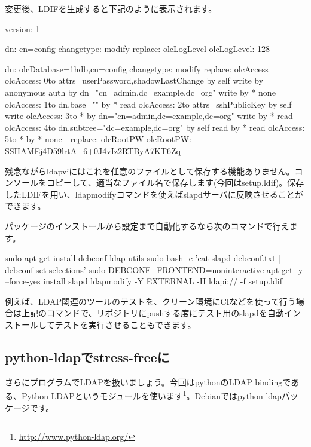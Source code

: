 \documentclass[mingoth,a4paper]{jsarticle}
\begin{document}
変更後、LDIFを生成すると下記のように表示されます。

\begin{commandline}
version: 1

dn: cn=config
changetype: modify
replace: olcLogLevel
olcLogLevel: 128
-

dn: olcDatabase={1}hdb,cn=config
changetype: modify
replace: olcAccess
olcAccess: {0}to attrs=userPassword,shadowLastChange by self write by anonymous auth
 by dn="cn=admin,dc=example,dc=org" write by * none
olcAccess: {1}to dn.base="" by * read
olcAccess: {2}to attrs=sshPublicKey by self write
olcAccess: {3}to * by dn="cn=admin,dc=example,dc=org" write by * read
olcAccess: {4}to dn.subtree="dc=example,dc=org" by self read by * read
olcAccess: {5}to * by * none
-
replace: olcRootPW
olcRootPW: {SSHA}MEj4D59lrtA+6+0J4vIz2RTByA7KT6Zq
\end{commandline}

残念ながらldapviにはこれを任意のファイルとして保存する機能ありません。コンソールをコピーして、適当なファイル名で保存します(今回はsetup.ldif)。保存したLDIFを用い、ldapmodifyコマンドを使えばslapdサーバに反映させることができます。


パッケージのインストールから設定まで自動化するなら次のコマンドで行えます。

\begin{commandline}
sudo apt-get install debconf ldap-utils
sudo bash -c 'cat slapd-debconf.txt | debconf-set-selections'
sudo DEBCONF_FRONTEND=noninteractive apt-get -y --force-yes install slapd
ldapmodify -Y EXTERNAL -H ldapi:// -f setup.ldif
\end{commandline}

例えば、LDAP関連のツールのテストを、クリーン環境にCIなどを使って行う場合は上記のコマンドで、リポジトリにpushする度にテスト用のslapdを自動インストールしてテストを実行させることもできます。

\subsection{python-ldapでstress-freeに}

さらにプログラムでLDAPを扱いましょう。今回はpythonのLDAP bindingである、Python-LDAPというモジュールを使います\footnote{\url{http://www.python-ldap.org/}}。Debianではpython-ldapパッケージです。
\end{document}
